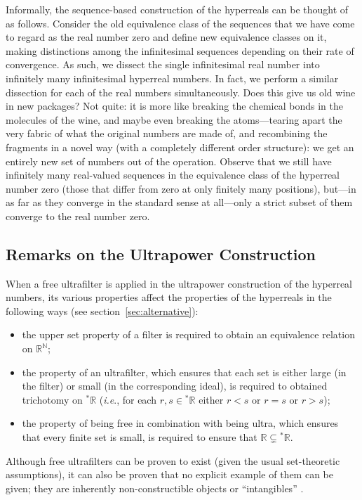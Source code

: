 Informally, the sequence-based construction of the hyperreals can be thought of as follows.
Consider the old equivalence class of the sequences that we have come to regard as the real number zero and define new equivalence classes on it, making distinctions among the infinitesimal sequences depending on their rate of convergence. As such, we dissect the single infinitesimal real number into infinitely many infinitesimal hyperreal numbers. In fact, we perform a similar dissection for each of the real numbers simultaneously.
Does this give us old wine in new packages? Not quite: it is more like breaking the chemical bonds in the molecules of the wine, and maybe even breaking the atoms---tearing apart the very fabric of what the original numbers are made of, and recombining the fragments in a novel way (with a completely different order structure): we get an entirely new set of numbers out of the operation.
Observe that we still have infinitely many real-valued sequences in the equivalence class of the hyperreal number zero (those that differ from zero at only finitely many positions), but---in as far as they converge in the standard sense at all---only a strict subset of them converge to the real number zero.

\subsection{Remarks on the Ultrapower Construction}
When a free ultrafilter is applied in the ultrapower construction of the hyperreal numbers, its various properties affect the properties of the hyperreals in the following ways (see section~\ref{sec:alternative}):
\begin{itemize}
  \item the upper set property of a filter is required to obtain an equivalence relation on $\mathbb{R}^\mathbb{N}$;
  \item the property of an ultrafilter, which ensures that each set is either large (in the filter) or small (in the corresponding ideal), is required to obtained trichotomy on ${^\ast\mathbb{R}}$ (\textit{i.e}., for each $r,s \in {^\ast\mathbb{R}}$ either $r<s$ or $r=s$ or $r>s$);
  \item the property of being free in combination with being ultra, which ensures that every finite set is small, is required to ensure that $\mathbb{R} \varsubsetneq {^\ast\mathbb{R}}$.
\end{itemize}

Although free ultrafilters can be proven to exist (given the usual set-theoretic assumptions), it can also be proven that no explicit example of them can be given; they are inherently non-constructible objects or ``intangibles'' \citep{Schechter:1997}.

